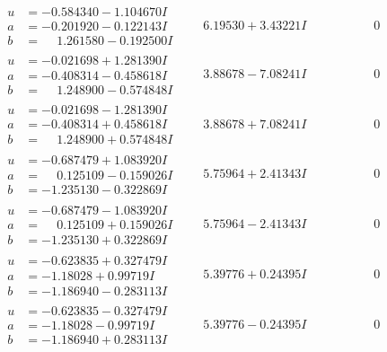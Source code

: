 \documentclass[1p]{elsarticle_modified}
\theoremstyle{definition}
\begin{document}
$$\begin{array}{c|c|c}
\begin{aligned}
u &= -0.584340 - 1.104670 I \\
a &= -0.201920 - 0.122143 I \\
b &= \phantom{-}1.261580 - 0.192500 I\end{aligned}
 & \phantom{-}6.19530 + 3.43221 I & \phantom{-0.000000 } 0 \\ \hline\begin{aligned}
u &= -0.021698 + 1.281390 I \\
a &= -0.408314 - 0.458618 I \\
b &= \phantom{-}1.248900 - 0.574848 I\end{aligned}
 & \phantom{-}3.88678 - 7.08241 I & \phantom{-0.000000 } 0 \\ \hline\begin{aligned}
u &= -0.021698 - 1.281390 I \\
a &= -0.408314 + 0.458618 I \\
b &= \phantom{-}1.248900 + 0.574848 I\end{aligned}
 & \phantom{-}3.88678 + 7.08241 I & \phantom{-0.000000 } 0 \\ \hline\begin{aligned}
u &= -0.687479 + 1.083920 I \\
a &= \phantom{-}0.125109 - 0.159026 I \\
b &= -1.235130 - 0.322869 I\end{aligned}
 & \phantom{-}5.75964 + 2.41343 I & \phantom{-0.000000 } 0 \\ \hline\begin{aligned}
u &= -0.687479 - 1.083920 I \\
a &= \phantom{-}0.125109 + 0.159026 I \\
b &= -1.235130 + 0.322869 I\end{aligned}
 & \phantom{-}5.75964 - 2.41343 I & \phantom{-0.000000 } 0 \\ \hline\begin{aligned}
u &= -0.623835 + 0.327479 I \\
a &= -1.18028 + 0.99719 I \\
b &= -1.186940 - 0.283113 I\end{aligned}
 & \phantom{-}5.39776 + 0.24395 I & \phantom{-0.000000 } 0 \\ \hline\begin{aligned}
u &= -0.623835 - 0.327479 I \\
a &= -1.18028 - 0.99719 I \\
b &= -1.186940 + 0.283113 I\end{aligned}
 & \phantom{-}5.39776 - 0.24395 I & \phantom{-0.000000 } 0 \\ \hline\begin{aligned}

\end{aligned}
\end{array}$$
\end{document}
